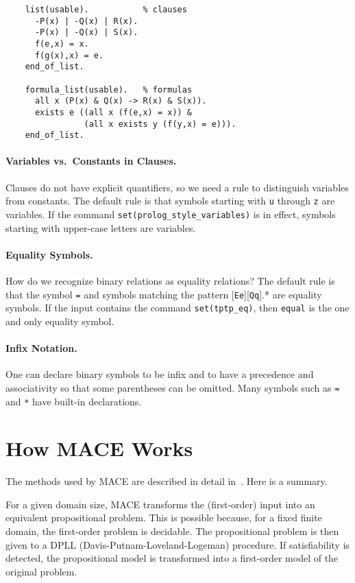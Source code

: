 \documentclass[11pt]{article}
\begin{document}
\begin{small}
\begin{verbatim}
    list(usable).           % clauses
      -P(x) | -Q(x) | R(x).
      -P(x) | -Q(x) | S(x).
      f(e,x) = x.
      f(g(x),x) = e.
    end_of_list.

    formula_list(usable).   % formulas
      all x (P(x) & Q(x) -> R(x) & S(x)).
      exists e ((all x (f(e,x) = x)) &
                (all x exists y (f(y,x) = e))).
    end_of_list.
\end{verbatim}
\end{small}

\paragraph{Variables vs.~Constants in Clauses.}
Clauses do not have explicit quantifiers, so we need a rule to
distinguish variables from constants.  The default rule is that
symbols starting with \texttt{u} through \texttt{z} are variables.  If
the command \texttt{set(prolog\_style\_variables)} is in effect, symbols
starting with upper-case letters are variables.

\paragraph{Equality Symbols.}
How do we recognize binary relations as equality relations?  The
default rule is that the symbol \texttt{=} and symbols matching the
pattern [\texttt{Ee}][\texttt{Qq}].* are equality symbols.  If the
input contains the command \texttt{set(tptp\_eq)}, then \texttt{equal} is
the one and only equality symbol.

\paragraph{Infix Notation.}
One can declare binary symbols to be infix and to have a precedence
and associativity so that some parentheses can be omitted.  Many symbols
such as \texttt{=} and \texttt{*} have built-in declarations.

\section{How MACE Works}

The methods used by MACE are described in detail in~\cite{dp-quasi}.
Here is a summary.

For a given domain size, MACE transforms the (first-order) input into
an equivalent propositional problem.  This is possible because,
for a fixed finite domain, the first-order problem is decidable.
The propositional problem is then given to a DPLL
(Davis-Putnam-Loveland-Logeman) procedure.  If satisfiability is
detected, the propositional model is transformed into a first-order
model of the original problem.
\end{document}
